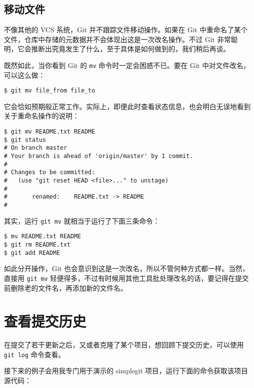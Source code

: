 \documentclass[a4paper]{book}
\begin{document}
\subsection{移动文件}

不像其他的 VCS 系统，Git 并不跟踪文件移动操作。如果在 Git 中重命名了某个文件，仓库中存储的元数据并不会体现出这是一次改名操作。不过 Git 非常聪明，它会推断出究竟发生了什么，至于具体是如何做到的，我们稍后再谈。

既然如此，当你看到 Git 的 \texttt{mv} 命令时一定会困惑不已。要在 Git 中对文件改名，可以这么做：

\begin{shaded}\begin{verbatim}
$ git mv file_from file_to
\end{verbatim}\end{shaded}

它会恰如预期般正常工作。实际上，即便此时查看状态信息，也会明白无误地看到关于重命名操作的说明：

\begin{shaded}\begin{verbatim}
$ git mv README.txt README
$ git status
# On branch master
# Your branch is ahead of 'origin/master' by 1 commit.
#
# Changes to be committed:
#   (use "git reset HEAD <file>..." to unstage)
#
#       renamed:    README.txt -> README
#
\end{verbatim}\end{shaded}

其实，运行 \texttt{git mv} 就相当于运行了下面三条命令：

\begin{shaded}\begin{verbatim}
$ mv README.txt README
$ git rm README.txt
$ git add README
\end{verbatim}\end{shaded}

如此分开操作，Git 也会意识到这是一次改名，所以不管何种方式都一样。当然，直接用 \texttt{git mv} 轻便得多，不过有时候用其他工具批处理改名的话，要记得在提交前删除老的文件名，再添加新的文件名。

\section{查看提交历史}

在提交了若干更新之后，又或者克隆了某个项目，想回顾下提交历史，可以使用 \texttt{git log} 命令查看。

接下来的例子会用我专门用于演示的 simplegit 项目，运行下面的命令获取该项目源代码：
\end{document}
